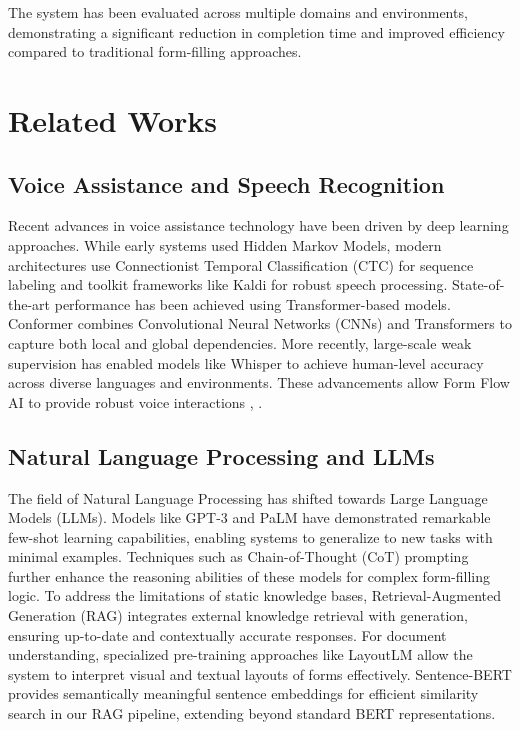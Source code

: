 \documentclass[conference]{IEEEtran}
\begin{document}
The system has been evaluated across multiple domains and environments, demonstrating a significant reduction in completion time and improved efficiency compared to traditional form-filling approaches.

\section{Related Works}

\subsection{Voice Assistance and Speech Recognition}

Recent advances in voice assistance technology have been driven by deep learning approaches. While early systems used Hidden Markov Models, modern architectures use Connectionist Temporal Classification (CTC) for sequence labeling \cite{b14} and toolkit frameworks like Kaldi \cite{b13} for robust speech processing. 
State-of-the-art performance has been achieved using Transformer-based models. Conformer \cite{b12} combines Convolutional Neural Networks (CNNs) and Transformers to capture both local and global dependencies. More recently, large-scale weak supervision has enabled models like Whisper \cite{b11} to achieve human-level accuracy across diverse languages and environments. These advancements allow Form Flow AI to provide robust voice interactions \cite{b2}, \cite{b5}.

\subsection{Natural Language Processing and LLMs}

The field of Natural Language Processing has shifted towards Large Language Models (LLMs). Models like GPT-3 \cite{b10} and PaLM \cite{b17} have demonstrated remarkable few-shot learning capabilities, enabling systems to generalize to new tasks with minimal examples. Techniques such as Chain-of-Thought (CoT) prompting \cite{b18} further enhance the reasoning abilities of these models for complex form-filling logic.
To address the limitations of static knowledge bases, Retrieval-Augmented Generation (RAG) \cite{b9} integrates external knowledge retrieval with generation, ensuring up-to-date and contextually accurate responses. For document understanding, specialized pre-training approaches like LayoutLM \cite{b20} allow the system to interpret visual and textual layouts of forms effectively. Sentence-BERT \cite{b19} provides semantically meaningful sentence embeddings for efficient similarity search in our RAG pipeline, extending beyond standard BERT \cite{b4} representations.
\end{document}
